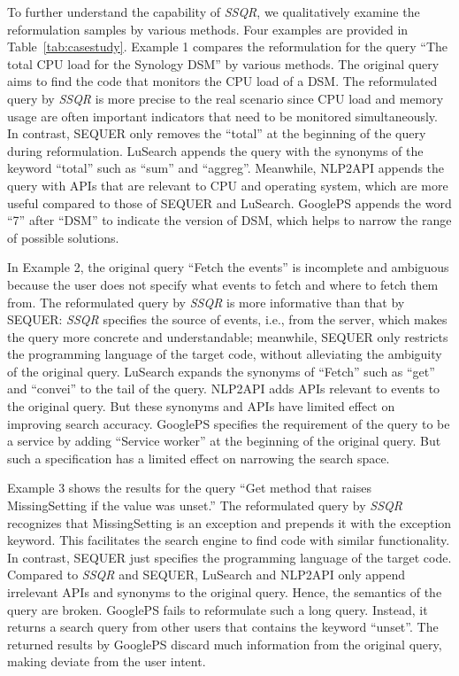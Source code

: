 \documentclass[sigconf,screen]{acmart}
\newcommand{\ourmethod}{\textit{SSQR}\xspace}
\begin{document}
To further understand the capability of \ourmethod, we qualitatively examine the reformulation samples by various methods. Four examples are provided in Table~\ref{tab:casestudy}.
Example 1 compares the reformulation for the query ``The total CPU load for the Synology DSM'' by various methods. The original query aims to find the code that monitors the CPU load of a DSM. The reformulated query by \ourmethod is more precise to the real scenario since CPU load and memory usage are often important indicators that need to be monitored simultaneously. In contrast, SEQUER only removes the ``total'' at the beginning of the query during reformulation. LuSearch appends the query with the synonyms of the keyword ``total'' such as ``sum'' and ``aggreg''. Meanwhile, NLP2API appends the query with APIs that are relevant to CPU and operating system, which are more useful compared to those of SEQUER and LuSearch. GooglePS appends the word ``7'' after ``DSM'' to indicate the version of DSM, which helps to narrow the range of possible solutions.

In Example 2, the original query ``Fetch the events'' is incomplete and ambiguous because the user does not specify what events to fetch and where to fetch them from. The reformulated query by \ourmethod is more informative than that by SEQUER: \ourmethod specifies the source of events, i.e., from the server, which makes the query more concrete and understandable; meanwhile, SEQUER only restricts the programming language of the target code, without alleviating the ambiguity of the original query. LuSearch expands the synonyms of ``Fetch'' such as ``get'' and ``convei'' to the tail of the query. NLP2API adds APIs relevant to events to the original query. But these synonyms and APIs have limited effect on improving search accuracy. GooglePS specifies the requirement of the query to be a service by adding ``Service worker'' at the beginning of the original query. But such a specification has a limited effect on narrowing the search space.

Example 3 shows the results for the query ``Get method that raises MissingSetting if the value was unset.'' The reformulated query by \ourmethod recognizes that MissingSetting is an exception and prepends it with the exception keyword. This facilitates the search engine to find code with similar functionality. In contrast, SEQUER just specifies the programming language of the target code. Compared to \ourmethod and SEQUER, LuSearch and NLP2API only append irrelevant APIs and synonyms to the original query. Hence, the semantics of the query are broken. GooglePS fails to reformulate such a long query. Instead, it returns a search query from other users that contains the keyword ``unset''. The returned results by GooglePS discard much information from the original query, making  deviate from the user intent.
\end{document}
